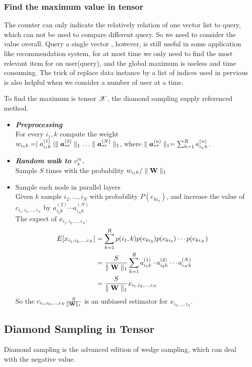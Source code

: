 \documentclass{article}
\newcommand{\Sca}[3]{{#1}^{(#2)}_{i_#2#3}}%
\newcommand{\T}[1]{\boldsymbol{\mathscr{\MakeUppercase{#1}}}}%
\newcommand{\V}[1]{{\bm{{\MakeLowercase{#1}}}}}%
\newcommand{\Vacol}[1]{\V{a}^{(#1)}_{*r}}
\newcommand{\M}[1]{{\bm{\mathbf{\MakeUppercase{#1}}}}}%
\newcommand{\norm}[2]{\parallel#1\parallel_{#2}}
\begin{document}
\subsubsection{Find the maximum value in tensor }
The counter can only indicate the relatively relation of one vector list to query, which can not be used to compare different query. So we need to consider the value overall. Query a single vector , however, is still useful in some application like recommendation system, for at most time we only need to find the most relevant item for on user(query), and the global maximum is useless and time consuming. The trick of replace data instance by a list of indices used in pervious is also helpful when we consider a number of user at a time.

To find the maximum is tensor $\T{X}$, the diamond sampling supply referenced method.
\begin{itemize}
  \item \emph{\textbf{Preprocessing}}\\
    For every $i_1,k$ compute the weight\\
   $w_{i_1k} = \mid \Sca{a}{1}{k}\mid  \norm{\Vacol{2}}{1}\ldots\norm{\Vacol{N}}{1}$, where $\norm{\Vacol{n}}{1} = \sum_{h=1}^{R}\Sca{a}{n}{h}$.
  \item \emph{\textbf{Random walk to $v_k^m$.}}\\
    Sample $S$ times  with the probability $w_{i_1k}/\norm{\M{W}}{1}$

  \item Sample each node in parallel layers \\
    Given $k$ sample ${i_2,\ldots,i_N}$ with probability $P(e_{ki_n})$, and increase the value of $c_{i_1,i_2,\ldots,i_N}$ by $\Sca{a}{2}{k}\cdots\Sca{a}{N}{k} $ \\
  The expect of $x_{i_1,i_2,\ldots,i_N}$.
        \begin{align*}
        E[x_{i_1,i_2,\ldots,i_N}] &= \sum_{k=1}^{R} p(i_1,k) p(e_{ki_2}) p(e_{ki_3}) \cdots p(e_{ki_N})\\
               &= \frac{S}{\norm{\M{W}}{1}}\sum_{k=1}^{R}\Sca{a}{1}{k}\cdot\Sca{a}{2}{k}\cdots\Sca{a}{N}{k}\\
               &= \frac{S}{\norm{\M{W}}{1}}x_{i_1,i_2,\ldots,i_N}
        \end{align*}
    So the  $c_{i_1,i_2,\ldots,i_N}\frac{S}{\norm{\M{W}}{1}}$ is an unbiased estimator for $x_{i_2,\ldots,i_N}$.
\end{itemize}


\subsection{Diamond Sampling in Tensor}
Diamond sampling is the advanced edition of wedge sampling, which can deal with the negative value.
\end{document}
